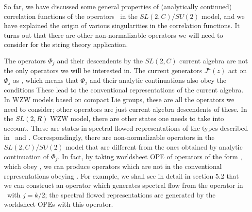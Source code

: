 
So far, we have discussed some general properties of
(analytically continued)
correlation functions of the operators \operators\ in
the $SL(2,C)/SU(2)$ model, and we have explained
the origin of various singularities in the correlation
functions. It turns out that there are other non-normalizable
 operators we will need to consider for the string theory application.


%

The operators $\Phi_j$ and their descendents by
the $SL(2,C)$ current algebra are not
the only operators we will be interested in.
The current generators $J^a(z)$ act on $\Phi_j$ as
\slaction , which means that
$\Phi_j$ and their analytic continuations
also  obey the conditions
\eqn{}
These lead to the conventional representations of the
current algebra. In WZW models based on compact Lie groups,
these are all the operators we need
to consider; other operators are just current algebra descendents of
these. In the $SL(2,R)$ WZW model, there are other states
one needs to take into account. These are states in spectral flowed
representations of the types described in
\hwsdisc\ and \hwscont .
Correspondingly, there are
non-normalizable operators in the $SL(2,C)/SU(2)$ model
that are different from the ones obtained by analytic continuation
of $\Phi_j$.
In fact, by taking worldsheet OPE of operators of the form
\operators , which obey \standard ,
we can produce operators which are not in the conventional
representations obeying \slaction .
For example, we shall see in detail in section 5.2
 that we can construct an operator which generates
 spectral flow from the operator in
\operators\ with $j= k/2 $; the
spectral flowed representations
are generated by the worldsheet OPEs with this operator.



